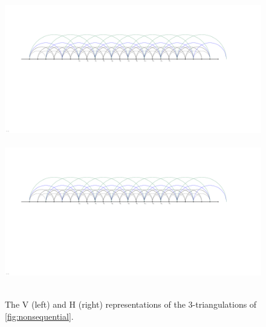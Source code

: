 \documentclass{amsart}
\theoremstyle{remark}
\begin{document}
\begin{figure}
	\capstart
	\mbox{\includegraphics[page=6, scale=.5, clip, trim=21.2cm 0cm 24cm 6cm]{FNSk3p2} \quad {}} \\[.5cm]
	\mbox{\includegraphics[page=7, scale=.5, clip, trim=21.2cm 0cm 24cm 6cm]{FNSk3p2} \quad {}}
	\caption{The V (left) and H (right) representations of the $3$-triangulations of \cref{fig:nonsequential}.}
	\label{fig:nonsequentialVHrep}
\end{figure}
\end{document}
